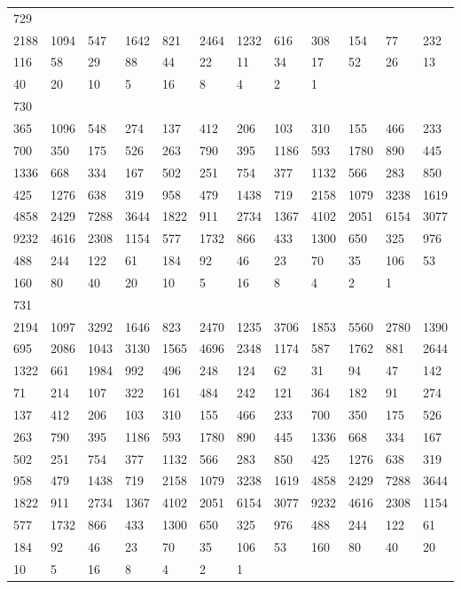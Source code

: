 \begin{longtable}{llllllllllll}
729&&&&&&&&&&&\\
2188& 1094& 547& 1642& 821& 2464& 1232& 616& 308& 154& 77& 232\\
116& 58& 29& 88& 44& 22& 11& 34& 17& 52& 26& 13\\
40& 20& 10& 5& 16& 8& 4& 2& 1& \\

730&&&&&&&&&&&\\
365& 1096& 548& 274& 137& 412& 206& 103& 310& 155& 466& 233\\
700& 350& 175& 526& 263& 790& 395& 1186& 593& 1780& 890& 445\\
1336& 668& 334& 167& 502& 251& 754& 377& 1132& 566& 283& 850\\
425& 1276& 638& 319& 958& 479& 1438& 719& 2158& 1079& 3238& 1619\\
4858& 2429& 7288& 3644& 1822& 911& 2734& 1367& 4102& 2051& 6154& 3077\\
9232& 4616& 2308& 1154& 577& 1732& 866& 433& 1300& 650& 325& 976\\
488& 244& 122& 61& 184& 92& 46& 23& 70& 35& 106& 53\\
160& 80& 40& 20& 10& 5& 16& 8& 4& 2& 1& \\

731&&&&&&&&&&&\\
2194& 1097& 3292& 1646& 823& 2470& 1235& 3706& 1853& 5560& 2780& 1390\\
695& 2086& 1043& 3130& 1565& 4696& 2348& 1174& 587& 1762& 881& 2644\\
1322& 661& 1984& 992& 496& 248& 124& 62& 31& 94& 47& 142\\
71& 214& 107& 322& 161& 484& 242& 121& 364& 182& 91& 274\\
137& 412& 206& 103& 310& 155& 466& 233& 700& 350& 175& 526\\
263& 790& 395& 1186& 593& 1780& 890& 445& 1336& 668& 334& 167\\
502& 251& 754& 377& 1132& 566& 283& 850& 425& 1276& 638& 319\\
958& 479& 1438& 719& 2158& 1079& 3238& 1619& 4858& 2429& 7288& 3644\\
1822& 911& 2734& 1367& 4102& 2051& 6154& 3077& 9232& 4616& 2308& 1154\\
577& 1732& 866& 433& 1300& 650& 325& 976& 488& 244& 122& 61\\
184& 92& 46& 23& 70& 35& 106& 53& 160& 80& 40& 20\\
10& 5& 16& 8& 4& 2& 1& \\


\end{longtable}
